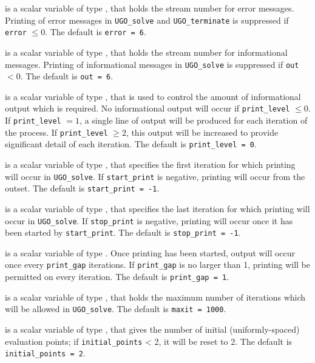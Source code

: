 \documentclass{galahad}
\newcommand{\packagename}{UGO}
\begin{document}
\begin{description}

 is a scalar variable of type \integer, that holds the
stream number for error messages. Printing of error messages in
{\tt \packagename\_solve} and {\tt \packagename\_terminate}
is suppressed if {\tt error} $\leq 0$.
The default is {\tt error = 6}.

 is a scalar variable of type \integer, that holds the
stream number for informational messages. Printing of informational messages in
{\tt \packagename\_solve} is suppressed if {\tt out} $< 0$.
The default is {\tt out = 6}.

 is a scalar variable of type \integer, that is used
to control the amount of informational output which is required. No
informational output will occur if {\tt print\_level} $\leq 0$. If
{\tt print\_level} $= 1$, a single line of output will be produced for each
iteration of the process. If {\tt print\_level} $\geq 2$, this output will be
increased to provide significant detail of each iteration.
The default is {\tt print\_level = 0}.

 is a scalar variable of type \integer, that specifies
the first iteration for which printing will occur in {\tt \packagename\_solve}.
If {\tt start\_print} is negative, printing will occur from the outset.
The default is {\tt start\_print = -1}.

 is a scalar variable of type \integer, that specifies
the last iteration for which printing will occur in  {\tt \packagename\_solve}.
If {\tt stop\_print} is negative, printing will occur once it has been
started by {\tt start\_print}.
The default is {\tt stop\_print = -1}.

 is a scalar variable of type \integer.
Once printing has been started, output will occur once every
{\tt print\_gap} iterations. If {\tt print\_gap} is no larger than 1,
printing will be permitted on every iteration.
The default is {\tt print\_gap = 1}.

 is a scalar variable of type \integer, that holds the
maximum number of iterations which will be allowed in {\tt \packagename\_solve}.
The default is {\tt maxit = 1000}.

 is a scalar variable of type \integer, that
gives the number of initial (uniformly-spaced) evaluation points; if
{\tt initial\_points} < 2, it will be reset to 2.
The default is {\tt initial\_points = 2}.


\end{description}
\end{document}
